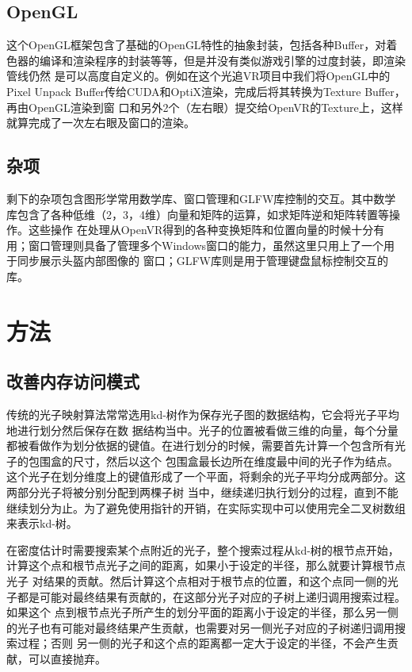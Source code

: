 \documentclass[UTF8]{ctexart}
\begin{document}
    \subsection{OpenGL}
        这个OpenGL框架包含了基础的OpenGL特性的抽象封装，包括各种Buffer，对着色器的编译和渲染程序的封装等等，但是并没有类似游戏引擎的过度封装，即渲染管线仍然
        是可以高度自定义的。例如在这个光追VR项目中我们将OpenGL中的Pixel Unpack Buffer传给CUDA和OptiX渲染，完成后将其转换为Texture Buffer，再由OpenGL渲染到窗
        口和另外2个（左右眼）提交给OpenVR的Texture上，这样就算完成了一次左右眼及窗口的渲染。
    \subsection{杂项}
        剩下的杂项包含图形学常用数学库、窗口管理和GLFW库控制的交互。其中数学库包含了各种低维（2，3，4维）向量和矩阵的运算，如求矩阵逆和矩阵转置等操作。这些操作
        在处理从OpenVR得到的各种变换矩阵和位置向量的时候十分有用；窗口管理则具备了管理多个Windows窗口的能力，虽然这里只用上了一个用于同步展示头盔内部图像的
        窗口；GLFW库则是用于管理键盘鼠标控制交互的库。
\section{方法}
    \subsection{改善内存访问模式}
        传统的光子映射算法\cite{jensen2000practical}常常选用kd-树\cite{1975Multidimensional}作为保存光子图的数据结构，它会将光子平均地进行划分然后保存在数
        据结构当中。光子的位置被看做三维的向量，每个分量都被看做作为划分依据的键值。在进行划分的时候，需要首先计算一个包含所有光子的包围盒的尺寸，然后以这个
        包围盒最长边所在维度最中间的光子作为结点。这个光子在划分维度上的键值形成了一个平面，将剩余的光子平均分成两部分。这两部分光子将被分别分配到两棵子树
        当中，继续递归执行划分的过程，直到不能继续划分为止。为了避免使用指针的开销，在实际实现中可以使用完全二叉树数组来表示kd-树。
        
        在密度估计时需要搜索某个点附近的光子，整个搜索过程从kd-树的根节点开始，计算这个点和根节点光子之间的距离，如果小于设定的半径，那么就要计算根节点光子
        对结果的贡献。然后计算这个点相对于根节点的位置，和这个点同一侧的光子都是可能对最终结果有贡献的，在这部分光子对应的子树上递归调用搜索过程。如果这个
        点到根节点光子所产生的划分平面的距离小于设定的半径，那么另一侧的光子也有可能对最终结果产生贡献，也需要对另一侧光子对应的子树递归调用搜索过程；否则
        另一侧的光子和这个点的距离都一定大于设定的半径，不会产生贡献，可以直接抛弃。
        
\end{document}
